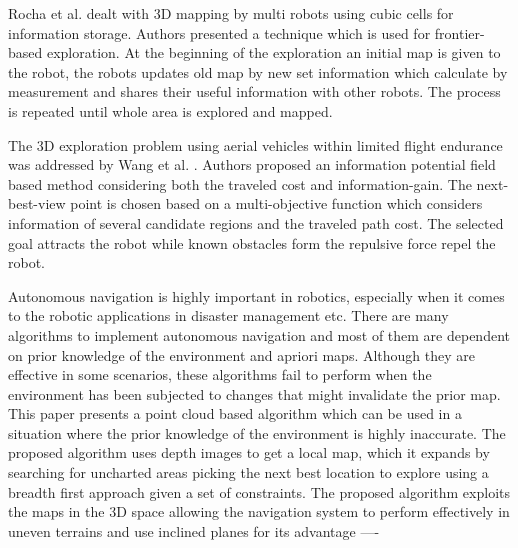 Rocha et al. \cite{Rocha2005} dealt with 3D mapping by multi robots using cubic cells for information storage. Authors presented a technique which is used for frontier-based exploration. At the beginning of the exploration an initial map is given to the robot, the robots updates old map by new set information which calculate by measurement and shares their useful information with other robots. The process is repeated until whole area is explored and mapped.

The 3D exploration problem using aerial vehicles within limited flight endurance was addressed by Wang et al. \cite{Wang2019}. Authors proposed an information potential field based method considering both the traveled cost and information-gain. The next-best-view point is chosen based on a multi-objective function which considers information of several candidate regions and the traveled path cost. The selected goal
attracts the robot while known obstacles form the repulsive
force repel the robot.

\cite{Priyasad2018}
Autonomous navigation is highly important in
robotics, especially when it comes to the robotic applications in
disaster management etc. There are many algorithms to implement autonomous navigation and most of them are dependent on
prior knowledge of the environment and apriori maps. Although
they are effective in some scenarios, these algorithms fail to
perform when the environment has been subjected to changes
that might invalidate the prior map. This paper presents a point
cloud based algorithm which can be used in a situation where
the prior knowledge of the environment is highly inaccurate. The
proposed algorithm uses depth images to get a local map, which
it expands by searching for uncharted areas picking the next best
location to explore using a breadth first approach given a set of
constraints. The proposed algorithm exploits the maps in the 3D
space allowing the navigation system to perform effectively in
uneven terrains and use inclined planes for its advantage
----


